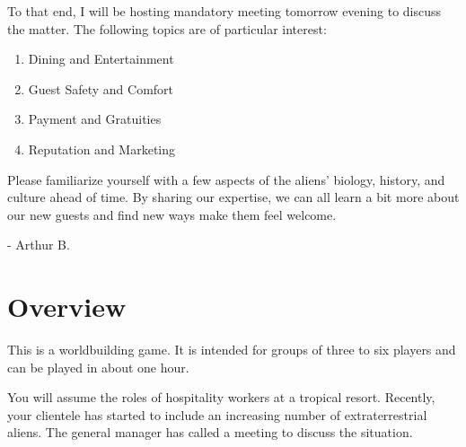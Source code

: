 \documentclass[a6paper, 11pt, parskip=half, DIV=15]{scrartcl}
\begin{document}
To that end, I will be hosting mandatory meeting tomorrow evening to discuss the matter.
The following topics are of particular interest:
\begin{enumerate}[nosep]
	\item Dining and Entertainment
	\item Guest Safety and Comfort
	\item Payment and Gratuities
	\item Reputation and Marketing
\end{enumerate}   

Please familiarize yourself with a few aspects of the aliens' biology, history, and culture ahead of time.
By sharing our expertise, we can all learn a bit more about our new guests and find new ways make them feel welcome.

\hspace{4.5cm}\huge\setmainfont{Caveat}- Arthur B.
\setmainfont{Quicksand}
\normalsize

\newpage
\enlargethispage{1.75\baselineskip}

\section*{Overview}
This is a worldbuilding game. It is intended for groups of three to six players and can be played in about one hour.

You will assume the roles of hospitality workers at a tropical resort. Recently, your clientele has started to include an increasing number of extraterrestrial aliens. The general manager has called a meeting to discuss the situation.

\vfill
\end{document}
